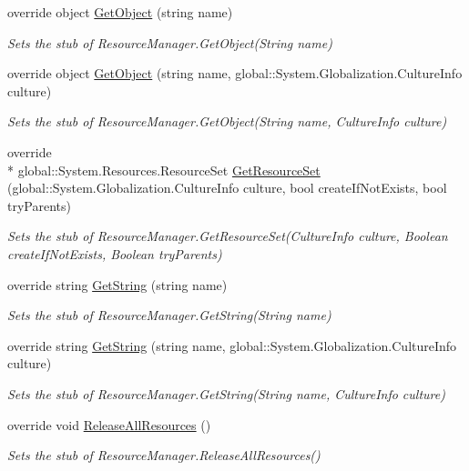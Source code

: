 \begin{DoxyCompactItemize}
override object \hyperlink{class_system_1_1_resources_1_1_fakes_1_1_stub_resource_manager_a7fcfae21f8416cfe27107a1ef9a8f8f9}{Get\-Object} (string name)
\begin{DoxyCompactList}\small\item\em Sets the stub of Resource\-Manager.\-Get\-Object(\-String name)\end{DoxyCompactList}\item 
override object \hyperlink{class_system_1_1_resources_1_1_fakes_1_1_stub_resource_manager_aea9cd59f1f33dae99abf5a7903c0aab9}{Get\-Object} (string name, global\-::\-System.\-Globalization.\-Culture\-Info culture)
\begin{DoxyCompactList}\small\item\em Sets the stub of Resource\-Manager.\-Get\-Object(\-String name, Culture\-Info culture)\end{DoxyCompactList}\item 
override \\*
global\-::\-System.\-Resources.\-Resource\-Set \hyperlink{class_system_1_1_resources_1_1_fakes_1_1_stub_resource_manager_aa6f7e5fb12ef51bf433d477b737354ab}{Get\-Resource\-Set} (global\-::\-System.\-Globalization.\-Culture\-Info culture, bool create\-If\-Not\-Exists, bool try\-Parents)
\begin{DoxyCompactList}\small\item\em Sets the stub of Resource\-Manager.\-Get\-Resource\-Set(\-Culture\-Info culture, Boolean create\-If\-Not\-Exists, Boolean try\-Parents)\end{DoxyCompactList}\item 
override string \hyperlink{class_system_1_1_resources_1_1_fakes_1_1_stub_resource_manager_a301cbd4b6f56e6c3cd19312bbe54c234}{Get\-String} (string name)
\begin{DoxyCompactList}\small\item\em Sets the stub of Resource\-Manager.\-Get\-String(\-String name)\end{DoxyCompactList}\item 
override string \hyperlink{class_system_1_1_resources_1_1_fakes_1_1_stub_resource_manager_a31a735f15d771c7d1e0235cae5aac0ae}{Get\-String} (string name, global\-::\-System.\-Globalization.\-Culture\-Info culture)
\begin{DoxyCompactList}\small\item\em Sets the stub of Resource\-Manager.\-Get\-String(\-String name, Culture\-Info culture)\end{DoxyCompactList}\item 
override void \hyperlink{class_system_1_1_resources_1_1_fakes_1_1_stub_resource_manager_a5c3dadfe8ee1528c22c858f81dcfd3a9}{Release\-All\-Resources} ()
\begin{DoxyCompactList}\small\item\em Sets the stub of Resource\-Manager.\-Release\-All\-Resources()\end{DoxyCompactList}\end{DoxyCompactItemize}
